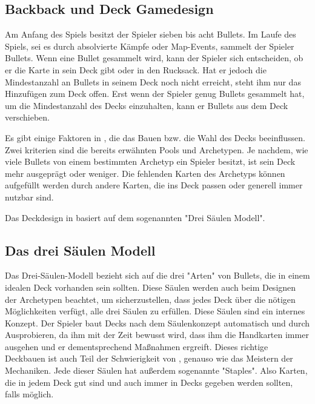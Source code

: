\subsection{Backback und Deck Gamedesign}\label{subsec:placementMatters}

Am Anfang des Spiels besitzt der Spieler sieben bis acht Bullets. Im Laufe des Spiels, sei es durch absolvierte Kämpfe
oder Map-Events, sammelt der Spieler Bullets. Wenn eine Bullet gesammelt wird, kann der Spieler sich entscheiden,
ob er die Karte in sein Deck gibt oder in den Rucksack. Hat er jedoch die Mindestanzahl an Bullets in seinem Deck
noch nicht erreicht, steht ihm nur das Hinzufügen zum Deck offen. Erst wenn der Spieler genug Bullets gesammelt hat,
um die Mindestanzahl des Decks einzuhalten, kann er Bullets aus dem Deck verschieben.


Es gibt einige Faktoren in \FF, die das Bauen bzw. die Wahl des Decks beeinflussen. Zwei kriterien sind die bereits erwähnten Pools und Archetypen.
Je nachdem, wie viele Bullets von einem bestimmten Archetyp ein Spieler besitzt, ist sein Deck mehr ausgeprägt oder weniger.
Die fehlenden Karten des Archetyps können aufgefüllt werden durch andere Karten, die ins Deck passen oder generell immer nutzbar sind.


Das Deckdesign in \FF basiert auf dem sogenannten "Drei Säulen Modell".


\subsection{Das drei Säulen Modell}\label{subsec:placementMatters}

Das Drei-Säulen-Modell bezieht sich auf die drei "Arten" von Bullets, die in einem idealen Deck vorhanden sein sollten.
Diese Säulen werden auch beim Designen der Archetypen beachtet, um sicherzustellen, dass jedes Deck über die nötigen
Möglichkeiten verfügt, alle drei Säulen zu erfüllen. Diese Säulen sind ein internes Konzept.
Der Spieler baut Decks nach dem Säulenkonzept automatisch und durch Ausprobieren, da ihm mit der Zeit bewusst wird,
dass ihm \zB die Handkarten immer ausgehen und er dementsprechend Maßnahmen ergreift. Dieses richtige Deckbauen
ist auch Teil der Schwierigkeit von \FF, genauso wie das Meistern der Mechaniken. Jede dieser Säulen hat außerdem sogenannte "Staples".
Also Karten, die in jedem Deck gut sind und auch immer in Decks gegeben werden sollten, falls möglich.


